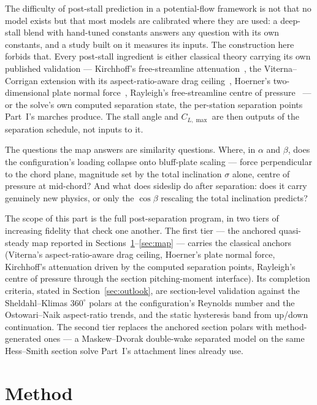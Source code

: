 \documentclass[submit]{aiaa-tc}
\begin{document}
The difficulty of post-stall prediction in a potential-flow framework is
not that no model exists but that most models are calibrated where they
are used: a deep-stall blend with hand-tuned constants answers any
question with its own constants, and a study built on it measures its
inputs. The construction here forbids that. Every post-stall ingredient
is either classical theory carrying its own published validation ---
Kirchhoff's free-streamline attenuation~\cite{leishman2006rotor},
the Viterna--Corrigan extension with its aspect-ratio-aware drag
ceiling~\cite{viternaCorrigan1982}, Hoerner's two-dimensional plate
normal force~\cite{hoerner1965fluiddynamicdrag}, Rayleigh's
free-streamline centre of pressure~\cite{rayleigh1876} --- or the
solve's own computed separation state, the per-station separation points
Part~I's marches produce. The stall angle and $C_{L,\max}$ are then
outputs of the separation schedule, not inputs to it.

The questions the map answers are similarity questions. Where, in
$\alpha$ and $\beta$, does the configuration's loading collapse onto
bluff-plate scaling --- force perpendicular to the chord plane,
magnitude set by the total inclination $\sigma$ alone, centre of
pressure at mid-chord? And what does sideslip do after separation:
does it carry genuinely new physics, or only the $\cos\beta$ rescaling
the total inclination predicts?

The scope of this part is the full post-separation program, in two
tiers of increasing fidelity that check one another. The first tier ---
the anchored quasi-steady map reported in
Sections~\ref{sec:method}--\ref{sec:map} --- carries the classical
anchors (Viterna's aspect-ratio-aware drag ceiling, Hoerner's plate
normal force, Kirchhoff's attenuation driven by the computed separation
points, Rayleigh's centre of pressure through the section
pitching-moment interface). Its completion criteria, stated in
Section~\ref{sec:outlook}, are section-level validation against the
Sheldahl--Klimas $360^\circ$ polars at the configuration's Reynolds
number and the Ostowari--Naik aspect-ratio trends, and the static
hysteresis band from up/down continuation. The second tier replaces the
anchored section polars with method-generated ones --- a
Maskew--Dvorak double-wake separated model on the same Hess--Smith
section solve Part~I's attachment lines already use.

\section{Method}
\label{sec:method}
\end{document}
